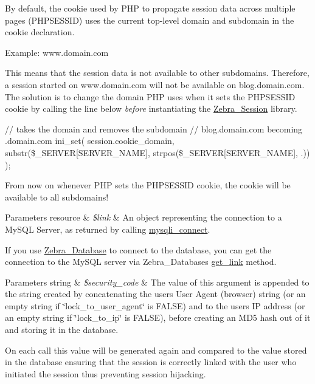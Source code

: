 By default, the cookie used by P\+HP to propagate session data across multiple pages (\textquotesingle{}P\+H\+P\+S\+E\+S\+S\+ID\textquotesingle{}) uses the current top-\/level domain and subdomain in the cookie declaration.

Example\+: www.\+domain.\+com

This means that the session data is not available to other subdomains. Therefore, a session started on www.\+domain.\+com will not be available on blog.\+domain.\+com. The solution is to change the domain P\+HP uses when it sets the \textquotesingle{}P\+H\+P\+S\+E\+S\+S\+ID\textquotesingle{} cookie by calling the line below {\itshape before} instantiating the \mbox{\hyperlink{class_zebra___session}{Zebra\+\_\+\+Session}} library.

{\ttfamily  // takes the domain and removes the subdomain // blog.\+domain.\+com becoming .domain.\+com ini\+\_\+set( \textquotesingle{}session.\+cookie\+\_\+domain\textquotesingle{}, substr(\$\+\_\+\+S\+E\+R\+V\+ER\mbox{[}\textquotesingle{}S\+E\+R\+V\+E\+R\+\_\+\+N\+A\+ME\textquotesingle{}\mbox{]}, strpos(\$\+\_\+\+S\+E\+R\+V\+ER\mbox{[}\textquotesingle{}S\+E\+R\+V\+E\+R\+\_\+\+N\+A\+ME\textquotesingle{}\mbox{]}, \textquotesingle{}.\textquotesingle{})) ); }

From now on whenever P\+HP sets the \textquotesingle{}P\+H\+P\+S\+E\+S\+S\+ID\textquotesingle{} cookie, the cookie will be available to all subdomains!


\begin{DoxyParams}[1]{Parameters}
resource & {\em \$link} & An object representing the connection to a My\+S\+QL Server, as returned by calling \mbox{\hyperlink{}{mysqli\+\_\+connect}}.\\
\hline
\end{DoxyParams}
If you use \mbox{\hyperlink{}{Zebra\+\_\+\+Database}} to connect to the database, you can get the connection to the My\+S\+QL server via Zebra\+\_\+\+Database\textquotesingle{}s \mbox{\hyperlink{}{get\+\_\+link}} method.


\begin{DoxyParams}[1]{Parameters}
string & {\em \$security\+\_\+code} & The value of this argument is appended to the string created by concatenating the user\textquotesingle{}s User Agent (browser) string (or an empty string if \char`\"{}lock\+\_\+to\+\_\+user\+\_\+agent\char`\"{} is F\+A\+L\+SE) and to the user\textquotesingle{}s IP address (or an empty string if \char`\"{}lock\+\_\+to\+\_\+ip\char`\"{} is F\+A\+L\+SE), before creating an M\+D5 hash out of it and storing it in the database.\\
\hline
\end{DoxyParams}
On each call this value will be generated again and compared to the value stored in the database ensuring that the session is correctly linked with the user who initiated the session thus preventing session hijacking.

